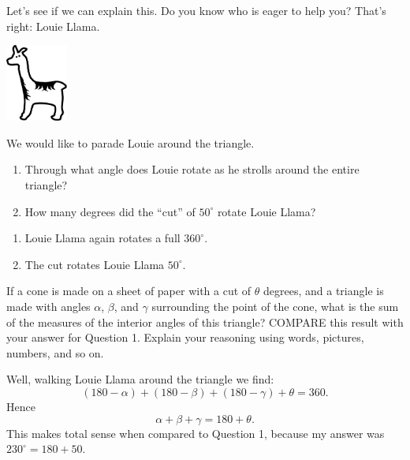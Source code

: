 \documentclass[nooutcomes,noauthor,handout]{ximera}
\begin{document}
\begin{question}
  Let's see if we can explain this. Do you know who is eager to help
you? That's right: Louie Llama.
\begin{center}
\includegraphics[height=1in]{llama.pdf}
\end{center}

We would like to parade Louie around the triangle.
\begin{enumerate}
\item Through what angle does Louie rotate as he strolls around the
  entire triangle?
\item How many degrees did the ``cut'' of $50^\circ$ rotate Louie
  Llama?
\end{enumerate}
\begin{freeResponse}
  \begin{enumerate}
  \item Louie Llama again rotates a full $360^\circ$.
  \item The cut rotates Louie Llama $50^\circ$.
  \end{enumerate}
\end{freeResponse}
\end{question}

\mynewpage


\begin{question}
If a cone is made on a sheet of paper with a cut of $\theta$ degrees,
and a triangle is made with angles $\alpha$, $\beta$, and $\gamma$
surrounding the point of the cone, what is the sum of the measures of
the interior angles of this triangle? COMPARE this result with your
answer for Question 1. Explain your reasoning using words, pictures,
numbers, and so on.
\begin{freeResponse}
  Well, walking Louie Llama around the triangle we find:
  \[
  (180-\alpha) + (180-\beta) + (180-\gamma) + \theta = 360.
  \]
  Hence
  \[
  \alpha + \beta + \gamma = 180 + \theta.
  \]
  This makes total sense when compared to Question 1, because my
  answer was $230^\circ = 180+50$.
\end{freeResponse}
\end{question}
\end{document}
